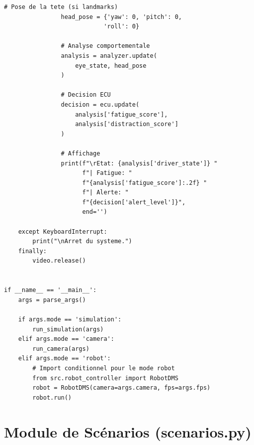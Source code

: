 \begin{lstlisting}[style=pythonstyle, caption={Point d'entrée principal du système DMS.}, label={lst:main}]
                # Pose de la tete (si landmarks)
                head_pose = {'yaw': 0, 'pitch': 0, 
                            'roll': 0}
                
                # Analyse comportementale
                analysis = analyzer.update(
                    eye_state, head_pose
                )
                
                # Decision ECU
                decision = ecu.update(
                    analysis['fatigue_score'],
                    analysis['distraction_score']
                )
                
                # Affichage
                print(f"\rEtat: {analysis['driver_state']} "
                      f"| Fatigue: "
                      f"{analysis['fatigue_score']:.2f} "
                      f"| Alerte: "
                      f"{decision['alert_level']}", 
                      end='')
    
    except KeyboardInterrupt:
        print("\nArret du systeme.")
    finally:
        video.release()


if __name__ == '__main__':
    args = parse_args()
    
    if args.mode == 'simulation':
        run_simulation(args)
    elif args.mode == 'camera':
        run_camera(args)
    elif args.mode == 'robot':
        # Import conditionnel pour le mode robot
        from src.robot_controller import RobotDMS
        robot = RobotDMS(camera=args.camera, fps=args.fps)
        robot.run()
\end{lstlisting}

\section{Module de Scénarios (scenarios.py)}

